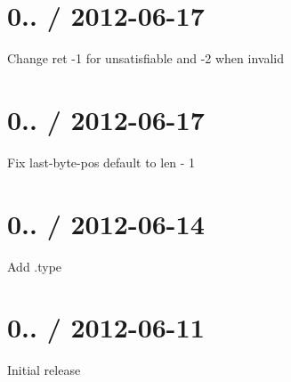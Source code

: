 \section*{0.. / 2012-\/06-\/17 }


\begin{DoxyItemize}
\item Change ret -\/1 for unsatisfiable and -\/2 when invalid
\end{DoxyItemize}

\section*{0.. / 2012-\/06-\/17 }


\begin{DoxyItemize}
\item Fix last-\/byte-\/pos default to len -\/ 1
\end{DoxyItemize}

\section*{0.. / 2012-\/06-\/14 }


\begin{DoxyItemize}
\item Add {\ttfamily .type}
\end{DoxyItemize}

\section*{0.. / 2012-\/06-\/11 }


\begin{DoxyItemize}
\item Initial release 
\end{DoxyItemize}